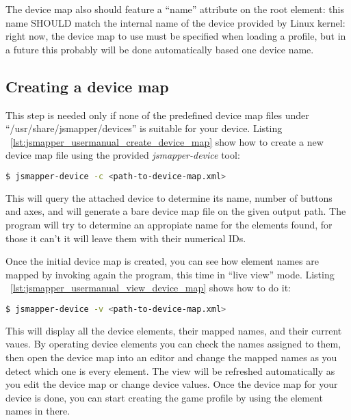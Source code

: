 The device map also should feature a ``name'' attribute on the root element: this name SHOULD match the internal name of the device provided by Linux kernel: right now, the device map to use must be specified when loading a profile, but in a future this probably will be done automatically based one device name.

\subsection{Creating a device map}
This step is needed only if none of the predefined device map files under ``/usr/share/jsmapper/devices'' is suitable for your device. Listing ~\ref{lst:jsmapper_usermanual_create_device_map} show how to create a new device map file using the provided \emph{jsmapper-device} tool:
\begin{lstlisting}[language=bash,caption={Creating a new device map file},label={lst:jsmapper_usermanual_create_device_map}]
$ jsmapper-device -c <path-to-device-map.xml>
\end{lstlisting}

This will query the attached device to determine its name, number of buttons and axes, and will generate a bare device map file on the given output path. The program will try to determine an appropiate name for the elements found, for those it can't it will leave them with their numerical IDs.

Once the initial device map is created, you can see how element names are mapped by invoking again the program, this time in ``live view'' mode. Listing ~\ref{lst:jsmapper_usermanual_view_device_map} shows how to do it:
\begin{lstlisting}[language=bash,caption={Checking a device map file},label={lst:jsmapper_usermanual_view_device_map}]
$ jsmapper-device -v <path-to-device-map.xml>
\end{lstlisting}

This will display all the device elements, their mapped names, and their current vaues. By operating device elements you can check the names assigned to them, then open the device map into an editor and change the mapped names as you detect which one is every element. The view will be refreshed automatically as you edit the device map or change device values.
Once the device map for your device is done, you can start creating the game profile by using the element names in there.

